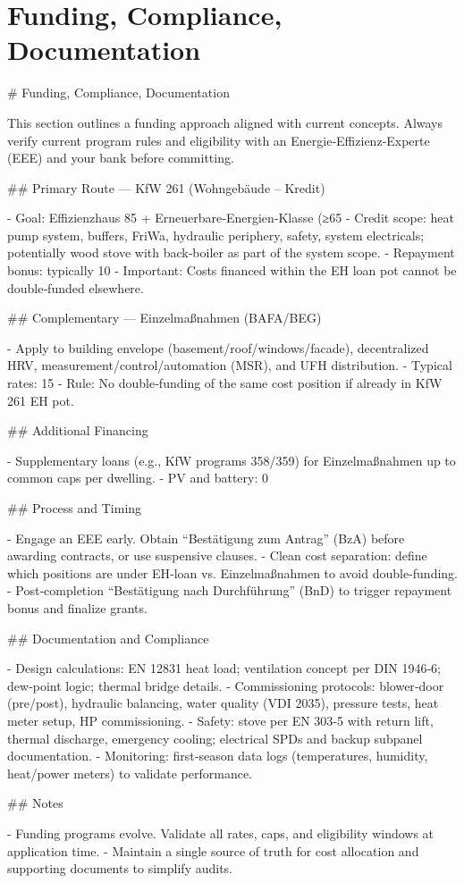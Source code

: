 \documentclass[11pt,oneside]{report}
\begin{document}
\chapter{Funding, Compliance, Documentation}
\begin{markdown}
# Funding, Compliance, Documentation

This section outlines a funding approach aligned with current concepts. Always verify current program rules and eligibility with an Energie‑Effizienz‑Experte (EEE) and your bank before committing.

## Primary Route — KfW 261 (Wohngebäude – Kredit)

- Goal: Effizienzhaus 85 + Erneuerbare‑Energien‑Klasse (≥65%
- Credit scope: heat pump system, buffers, FriWa, hydraulic periphery, safety, system electricals; potentially wood stove with back‑boiler as part of the system scope.
- Repayment bonus: typically 10%
- Important: Costs financed within the EH loan pot cannot be double‑funded elsewhere.

## Complementary — Einzelmaßnahmen (BAFA/BEG)

- Apply to building envelope (basement/roof/windows/facade), decentralized HRV, measurement/control/automation (MSR), and UFH distribution.
- Typical rates: 15%
- Rule: No double‑funding of the same cost position if already in KfW 261 EH pot.

## Additional Financing

- Supplementary loans (e.g., KfW programs 358/359) for Einzelmaßnahmen up to common caps per dwelling.
- PV and battery: 0%

## Process and Timing

- Engage an EEE early. Obtain “Bestätigung zum Antrag” (BzA) before awarding contracts, or use suspensive clauses.
- Clean cost separation: define which positions are under EH‑loan vs. Einzelmaßnahmen to avoid double‑funding.
- Post‑completion “Bestätigung nach Durchführung” (BnD) to trigger repayment bonus and finalize grants.

## Documentation and Compliance

- Design calculations: EN 12831 heat load; ventilation concept per DIN 1946‑6; dew‑point logic; thermal bridge details.
- Commissioning protocols: blower‑door (pre/post), hydraulic balancing, water quality (VDI 2035), pressure tests, heat meter setup, HP commissioning.
- Safety: stove per EN 303‑5 with return lift, thermal discharge, emergency cooling; electrical SPDs and backup subpanel documentation.
- Monitoring: first‑season data logs (temperatures, humidity, heat/power meters) to validate performance.

## Notes

- Funding programs evolve. Validate all rates, caps, and eligibility windows at application time.
- Maintain a single source of truth for cost allocation and supporting documents to simplify audits.
\end{markdown}
\end{document}
